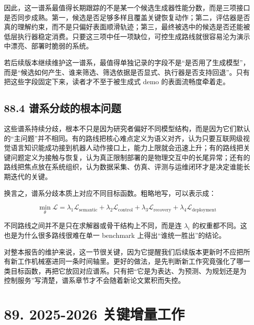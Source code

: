 因此，这一谱系最值得长期跟踪的不是某一个候选生成器性能分数，而是三项接口是否同步成熟。第一，候选是否足够多样且覆盖关键恢复动作；第二，评估器是否真的理解约束，而不是只偏好表面顺滑轨迹；第三，最终被选中的候选是否还能被低层执行器稳定消费。只要这三项中任一项缺位，可控生成路线就很容易沦为演示中漂亮、部署时脆弱的系统。

若后续版本继续维护这一谱系，最值得单独记录的字段不是“是否用了生成模型”，而是“候选如何产生、谁来筛选、筛选依据是否显式、执行器是否支持回退”。只有把这些字段固定下来，读者才不至于被生成式 demo 的表面流畅度牵着走。

\subsection*{88.4 谱系分歧的根本问题}


这些谱系持续分歧，根本不只是因为研究者偏好不同模型结构，而是因为它们默认的“主问题”并不相同。有的路线把核心难点定义为语义对齐，认为只要互联网级视觉语言知识能成功接到机器人动作接口上，能力上限就会迅速上升；有的路线把关键问题定义为接触与恢复，认为真正限制部署的是物理交互中的长尾异常；还有的路线把焦点放在系统组织，认为数据采集、仿真、评测与运维闭环才是决定谁能长期迭代的关键。

换言之，谱系分歧本质上对应不同目标函数。粗略地写，可以表示成：

\begingroup
\scriptsize
\begin{equation*}
\min_\theta \mathcal{L}=
\lambda_1 \mathcal{L}_{\text{semantic}}
+ \lambda_2 \mathcal{L}_{\text{control}}
+ \lambda_3 \mathcal{L}_{\text{recovery}}
+ \lambda_4 \mathcal{L}_{\text{deployment}}
\end{equation*}
\endgroup

不同路线之间并不是只在求解器或骨干结构上不同，而是连 \(\lambda_i\) 的权重都不同。这也是为什么很多路线很难在单一 benchmark 上得出“谁统一胜出”的结论。

对整本报告的维护来说，这一节很关键，因为它提醒我们后续版本更新时不应把所有新工作机械塞进同一条时间轴里。更好的做法，是先判断新工作究竟强化了哪一类目标函数，再把它放回对应谱系。只有把“它是为表达、为预测、为规划还是为控制服务”写清楚，谱系章节才不会随着新论文累积而失控。

\section*{89. 2025-2026 关键增量工作}

